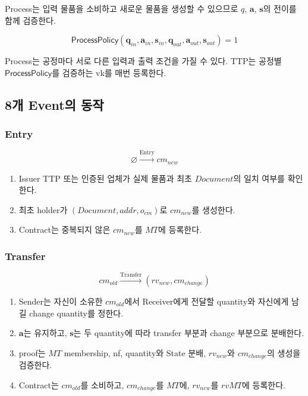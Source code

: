\documentclass[11pt,a4paper]{extarticle}
\begin{document}
Process는 입력 물품을 소비하고 새로운 물품을 생성할 수 있으므로
\(q\), \(\mathbf{a}\), \(\mathbf{s}\)의 전이를 함께 검증한다.

\[
  \mathsf{ProcessPolicy}
  (
  \mathbf{q}_{in},
  \mathbf{a}_{in},
  \mathbf{s}_{in},
  \mathbf{q}_{out},
  \mathbf{a}_{out},
  \mathbf{s}_{out}
  )
  =1
\]

Process는 공정마다 서로 다른 입력과 출력 조건을 가질 수 있다.
TTP는 공정별 \(\mathsf{ProcessPolicy}\)를 검증하는 vk를 매번 등록한다.

\subsection{8개 Event의 동작}

\subsubsection*{Entry}

\[
  \varnothing
  \xrightarrow{\mathrm{Entry}}
  cm_{new}
\]

\begin{enumerate}[label=\textbf{\arabic*.},leftmargin=18pt]
  \item Issuer TTP 또는 인증된 업체가 실제 물품과 최초
        \(\mathit{Document}\)의 일치 여부를 확인한다.
  \item 최초 holder가 \((\mathit{Document},addr,o_{cm})\)로
        \(cm_{new}\)를 생성한다.
  \item Contract는 중복되지 않은 \(cm_{new}\)를 \(MT\)에 등록한다.
\end{enumerate}

\subsubsection*{Transfer}

\[
  cm_{old}
  \xrightarrow{\mathrm{Transfer}}
  (rv_{new},cm_{change})
\]

\begin{enumerate}[label=\textbf{\arabic*.},leftmargin=18pt]
  \item Sender는 자신이 소유한 \(cm_{old}\)에서 Receiver에게 전달할 quantity와
        자신에게 남길 change quantity를 정한다.
  \item \(\mathbf{a}\)는 유지하고, \(\mathbf{s}\)는 두 quantity에 따라
        transfer 부분과 change 부분으로 분배한다.
  \item proof는 \(MT\) membership, nf, quantity와
        State 분배, \(rv_{new}\)와 \(cm_{change}\)의 생성을 검증한다.
  \item Contract는 \(cm_{old}\)를 소비하고, \(cm_{change}\)를 \(MT\)에,
        \(rv_{new}\)를 \(rvMT\)에 등록한다.
\end{enumerate}
\end{document}
